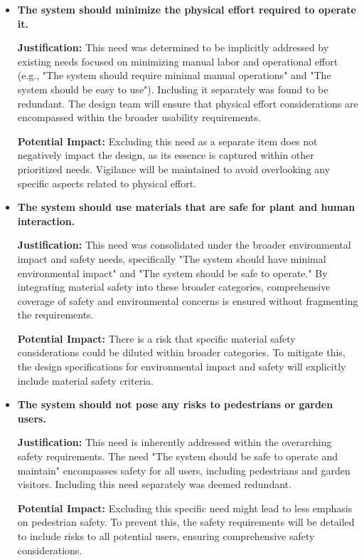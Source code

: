 \documentclass[12pt]{report}
\begin{document}
\begin{itemize}
    \item \textbf{The system should minimize the physical effort required to operate it.}

    \textbf{Justification:} This need was determined to be implicitly addressed by existing needs focused on minimizing manual labor and operational effort (e.g., "The system should require minimal manual operations" and "The system should be easy to use"). Including it separately was found to be redundant. The design team will ensure that physical effort considerations are encompassed within the broader usability requirements.

    \textbf{Potential Impact:} Excluding this need as a separate item does not negatively impact the design, as its essence is captured within other prioritized needs. Vigilance will be maintained to avoid overlooking any specific aspects related to physical effort.

    \item \textbf{The system should use materials that are safe for plant and human interaction.}

    \textbf{Justification:} This need was consolidated under the broader environmental impact and safety needs, specifically "The system should have minimal environmental impact" and "The system should be safe to operate." By integrating material safety into these broader categories, comprehensive coverage of safety and environmental concerns is ensured without fragmenting the requirements.

    \textbf{Potential Impact:} There is a risk that specific material safety considerations could be diluted within broader categories. To mitigate this, the design specifications for environmental impact and safety will explicitly include material safety criteria.

    \item \textbf{The system should not pose any risks to pedestrians or garden users.}

    \textbf{Justification:} This need is inherently addressed within the overarching safety requirements. The need "The system should be safe to operate and maintain" encompasses safety for all users, including pedestrians and garden visitors. Including this need separately was deemed redundant.

    \textbf{Potential Impact:} Excluding this specific need might lead to less emphasis on pedestrian safety. To prevent this, the safety requirements will be detailed to include risks to all potential users, ensuring comprehensive safety considerations.

\end{itemize}
\end{document}
